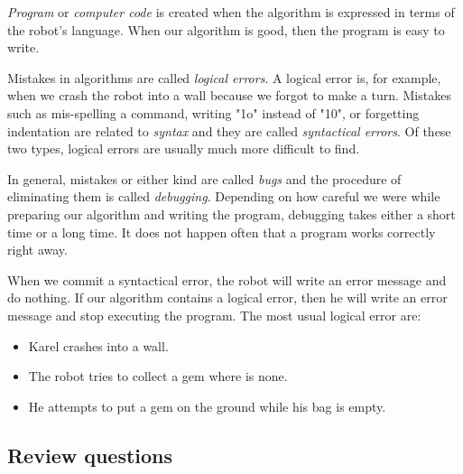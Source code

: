 {{{\em Program} or {\em computer code} is created when the algorithm is expressed
in terms of the robot's language. When our algorithm is good, then 
the program is easy to write.

Mistakes in algorithms are called {\em logical errors}. A logical error is, for 
example, when we crash the robot into a wall because we forgot to make a turn.
Mistakes such as mis-spelling a command, writing "1o" instead of "10", or forgetting 
indentation are related to 
{\em syntax} and they are called {\em syntactical errors}. Of these two types, 
logical errors are usually much more difficult to find. 

In general, mistakes or either kind are called {\em bugs} and the procedure of 
eliminating them is called {\em debugging}. Depending on how careful we 
were while preparing our algorithm and writing the program, debugging takes either 
a short time or a long time. It does not happen often that a program works correctly
right away. 

When we commit a syntactical error,
the robot will write an error message and do nothing.
If our algorithm contains a logical error, then he will
write an error message and stop executing the program. 
The most usual logical error are:

\begin{itemize}
\item Karel crashes into a wall.
\item The robot tries to collect a gem where is none.
\item He attempts to put a gem on the ground while his bag is empty.
\end{itemize}

\subsection{Review questions} 

}}
